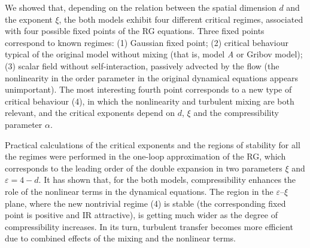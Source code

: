 \documentclass[12pt]{article}
\begin{document}
We showed that, depending on the relation between the spatial dimension
$d$ and the exponent $\xi$, the both models exhibit four different critical
regimes, associated with four possible fixed points of the RG equations.
Three fixed points correspond to known regimes: (1) Gaussian fixed point;
(2) critical behaviour typical of the original model without mixing (that is,
model {\it A} or Gribov model); (3) scalar field without self-interaction,
passively advected by the flow (the nonlinearity in the order parameter in
the original dynamical equations appears unimportant). The most interesting
fourth point corresponds to a new type of critical behaviour (4), in which
the nonlinearity and turbulent mixing are both relevant, and the critical
exponents depend on $d$, $\xi$ and the compressibility parameter $\alpha$.

Practical calculations of the critical exponents and the regions of
stability for all the regimes were performed in the one-loop approximation
of the RG, which corresponds to the leading order of the double expansion
in two parameters $\xi$ and $\varepsilon=4-d$. It has shown that, for the
both models, compressibility enhances the role of the nonlinear terms in
the dynamical equations. The region in the $\varepsilon$--$\xi$ plane,
where the new nontrivial regime (4) is stable (the corresponding fixed
point is positive and IR attractive), is getting much wider as the degree
of compressibility increases. In its turn, turbulent transfer becomes more
efficient due to combined effects of the mixing and the nonlinear terms.
\end{document}
